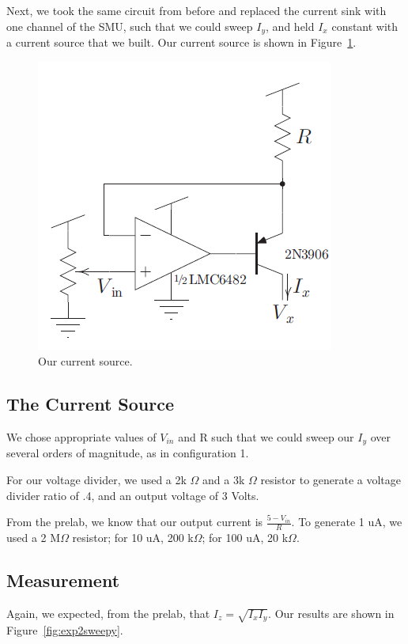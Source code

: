 \documentclass{article}
\begin{document}
Next, we took the same circuit from before and replaced the current sink with one channel of the SMU, such that we could sweep $I_y$, and held $I_x$ constant with a current source that we built.  Our current source is shown in Figure~\ref{fig:source}.

\begin{figure}[H]
\begin{center}
\includegraphics[scale=.5]{source.png}
\caption{Our current source.}
\label{fig:source}
\end{center}
\end{figure}

\subsection*{The Current Source}

We chose appropriate values of $V_{in}$ and R such that we could sweep our $I_y$ over several orders of magnitude, as in configuration 1.

For our voltage divider, we used a 2k $\Omega$ and a 3k $\Omega$ resistor to generate a voltage divider ratio of .4, and an output voltage of 3 Volts.

From the prelab, we know that our output current is $\frac{5 - V_{in}}{R}$.  To generate 1 uA, we used a 2 M$\Omega$ resistor; for 10 uA, 200 k$\Omega$; for 100 uA, 20 k$\Omega$.

\subsection*{Measurement}


Again, we expected, from the prelab, that $I_z = \sqrt{I_xI_y}$.  Our results are shown in Figure~\ref{fig:exp2sweepy}.
\end{document}
